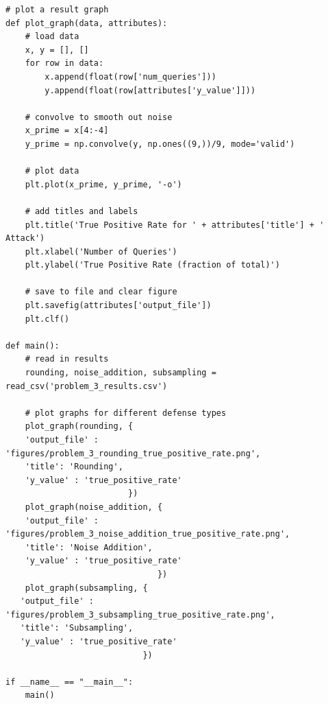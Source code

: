\documentclass[12pt]{article}
\begin{document}
\begin{appendices}
\begin{lstlisting}
# plot a result graph
def plot_graph(data, attributes):
    # load data
    x, y = [], []
    for row in data:
        x.append(float(row['num_queries']))
        y.append(float(row[attributes['y_value']]))

    # convolve to smooth out noise
    x_prime = x[4:-4]
    y_prime = np.convolve(y, np.ones((9,))/9, mode='valid')

    # plot data
    plt.plot(x_prime, y_prime, '-o') 

    # add titles and labels
    plt.title('True Positive Rate for ' + attributes['title'] + ' Attack')
    plt.xlabel('Number of Queries')
    plt.ylabel('True Positive Rate (fraction of total)')

    # save to file and clear figure
    plt.savefig(attributes['output_file'])
    plt.clf()

def main():
    # read in results
    rounding, noise_addition, subsampling = read_csv('problem_3_results.csv')

    # plot graphs for different defense types
    plot_graph(rounding, {
    'output_file' : 'figures/problem_3_rounding_true_positive_rate.png',
    'title': 'Rounding',
    'y_value' : 'true_positive_rate'
                         })
    plot_graph(noise_addition, {
    'output_file' : 'figures/problem_3_noise_addition_true_positive_rate.png',
    'title': 'Noise Addition',
    'y_value' : 'true_positive_rate'
                               })
    plot_graph(subsampling, {
   'output_file' : 'figures/problem_3_subsampling_true_positive_rate.png',
   'title': 'Subsampling',
   'y_value' : 'true_positive_rate'
                            })

if __name__ == "__main__":
    main()
\end{lstlisting}

\end{appendices}
\end{document}

